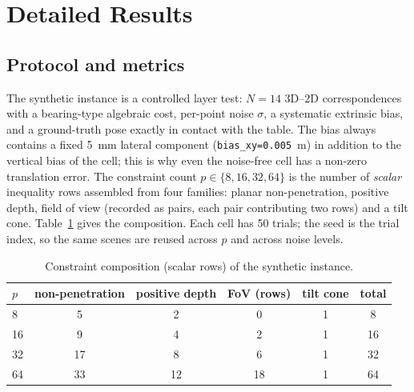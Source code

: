 \section{Detailed Results}\label{app:start}\label{app:details}

\subsection{Protocol and metrics}\label{app:protocol}
The synthetic instance is a controlled layer test: $N=14$ 3D--2D correspondences with a bearing-type algebraic cost, per-point noise $\sigma$, a systematic extrinsic bias, and a ground-truth pose exactly in contact with the table. The bias always contains a fixed 5~mm lateral component (\texttt{bias\_xy=0.005}~m) in addition to the vertical bias of the cell; this is why even the noise-free cell has a non-zero translation error. The constraint count $p\in\{8,16,32,64\}$ is the number of \emph{scalar} inequality rows assembled from four families: planar non-penetration, positive depth, field of view (recorded as pairs, each pair contributing two rows) and a tilt cone. Table~\ref{tab:app_comp} gives the composition. Each cell has 50 trials; the seed is the trial index, so the same scenes are reused across $p$ and across noise levels.

\begin{table}[t]
\centering
\caption{Constraint composition (scalar rows) of the synthetic instance.}
\label{tab:app_comp}
\footnotesize
\setlength{\tabcolsep}{4pt}
\begin{tabular}{@{}lccccc@{}}
\toprule
$p$ & non-penetration & positive depth & FoV (rows) & tilt cone & total \\
\midrule
8 & 5 & 2 & 0 & 1 & 8 \\
16 & 9 & 4 & 2 & 1 & 16 \\
32 & 17 & 8 & 6 & 1 & 32 \\
64 & 33 & 12 & 18 & 1 & 64 \\
\bottomrule
\end{tabular}

\end{table}

